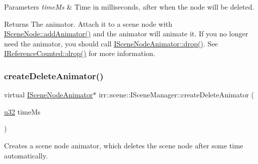 \begin{DoxyParams}{Parameters}
{\em time\+Ms} & Time in milliseconds, after when the node will be deleted. \\
\hline
\end{DoxyParams}
\begin{DoxyReturn}{Returns}
The animator. Attach it to a scene node with \hyperlink{classirr_1_1scene_1_1ISceneNode_a0e5cd342cd7293c136e53e2c2c5e0f3a}{I\+Scene\+Node\+::add\+Animator()} and the animator will animate it. If you no longer need the animator, you should call \hyperlink{classirr_1_1IReferenceCounted_a03856a09355b89d178090c4a5f738543}{I\+Scene\+Node\+Animator\+::drop()}. See \hyperlink{classirr_1_1IReferenceCounted_a03856a09355b89d178090c4a5f738543}{I\+Reference\+Counted\+::drop()} for more information. 
\end{DoxyReturn}
\mbox{\label{classirr_1_1scene_1_1ISceneManager_a163cc04ff2cb03852ac891de56200fa3}} 
\subsubsection{\texorpdfstring{create\+Delete\+Animator()}{createDeleteAnimator()}\hspace{0.1cm}{\footnotesize\ttfamily [2/2]}}
{\footnotesize\ttfamily virtual \hyperlink{classirr_1_1scene_1_1ISceneNodeAnimator}{I\+Scene\+Node\+Animator}$\ast$ irr\+::scene\+::\+I\+Scene\+Manager\+::create\+Delete\+Animator (\begin{DoxyParamCaption}\item[{\hyperlink{namespaceirr_a0416a53257075833e7002efd0a18e804}{u32}}]{time\+Ms }\end{DoxyParamCaption})\hspace{0.3cm}{\ttfamily [pure virtual]}}



Creates a scene node animator, which deletes the scene node after some time automatically. 


